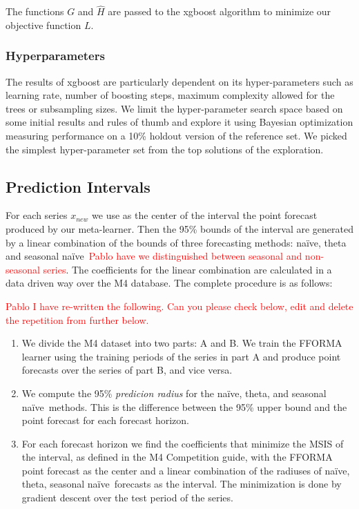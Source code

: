 \documentclass[11pt,a4paper,]{article}
\def\naive{na\"{i}ve}
\theoremstyle{definition}
\theoremstyle{definition}
\theoremstyle{definition}
\theoremstyle{remark}
\begin{document}
The functions \(G\) and \(\hat{H}\) are passed to the xgboost algorithm
to minimize our objective function \(L\).

\subsubsection{Hyperparameters}\label{hyperparameters}

The results of xgboost are particularly dependent on its
hyper-parameters such as learning rate, number of boosting steps,
maximum complexity allowed for the trees or subsampling sizes. We limit
the hyper-parameter search space based on some initial results and rules
of thumb and explore it using Bayesian optimization
\autocite[implemented in the \texttt{rBayesianOptimization} R
package][]{rBayesianOptimization} measuring performance on a 10\%
holdout version of the reference set. We picked the simplest
hyper-parameter set from the top solutions of the exploration.

\subsection{Prediction Intervals}\label{prediction-intervals}

For each series \(x_{new}\) we use as the center of the interval the
point forecast produced by our meta-learner. Then the 95\% bounds of the
interval are generated by a linear combination of the bounds of three
forecasting methods: \naive, theta and seasonal
\naive~\textcolor{red}{Pablo have we distinguished  between seasonal and non-seasonal series}.
The coefficients for the linear combination are calculated in a data
driven way over the M4 database. The complete procedure is as follows:

\textcolor{red}{Pablo I have re-written the following. Can you please check below, edit and delete the repetition from further below.}

\begin{enumerate}
\def\labelenumi{\arabic{enumi}.}
\item
  We divide the M4 dataset into two parts: A and B. We train the FFORMA
  learner using the training periods of the series in part A and produce
  point forecasts over the series of part B, and vice versa.
\item
  We compute the 95\% \emph{predicion radius} for the \naive, theta, and
  seasonal \naive~methods. This is the difference between the 95\% upper
  bound and the point forecast for each forecast horizon.
\item
  For each forecast horizon we find the coefficients that minimize the
  MSIS of the interval, as defined in the M4 Competition guide, with the
  FFORMA point forecast as the center and a linear combination of the
  radiuses of \naive, theta, seasonal \naive~forecasts as the interval.
  The minimization is done by gradient descent over the test period of
  the series.
\end{enumerate}
\end{document}
